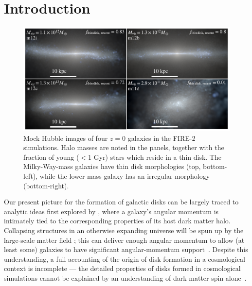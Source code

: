 \documentclass[fleqn,usenatbib]{mnras}
\begin{document}


\section{Introduction}
\label{s: introduction}

\begin{figure}
    \centering
    \includegraphics[width=\textwidth]{figures/stars.pdf}
    \caption{
    Mock Hubble images of four $z=0$ galaxies in the FIRE-2 simulations. Halo masses are noted in the panels, together with the fraction of young ($<1$ Gyr) stars which reside in a thin disk.  The Milky-Way-mass galaxies have thin disk morphologies (top, bottom-left), while the lower mass galaxy has an irregular morphology (bottom-right).
    }
    \label{f: stars}
\end{figure}

Our present picture for the formation of galactic disks can be largely traced to analytic ideas first explored by \citet{fall1980}, where a galaxy's angular momentum is intimately tied to the corresponding properties of its host dark matter halo.
Collapsing structures in an otherwise expanding universe will be spun up by the large-scale matter field \citep{Peebles69};
this can deliver enough angular momentum to allow (at least some) galaxies to have significant angular-momentum support~\citep[e.g.][]{MMW98}. 
Despite this understanding, a full accounting of the origin of disk formation in a cosmological context is incomplete --- the detailed properties of disks formed in cosmological simulations cannot be explained by an understanding of dark matter spin alone~\citep[e.g.][]{Sales2012, GK18}.  
\end{document}
